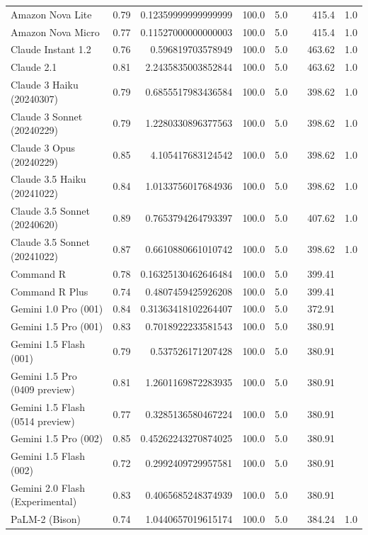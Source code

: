 \begin{table}[htp]
{\begin{tabular}{lrrrrrrr}
Amazon Nova Lite & 0.79 & 0.12359999999999999 & 100.0 & 5.0 &  & 415.4 & 1.0 \\
Amazon Nova Micro & 0.77 & 0.11527000000000003 & 100.0 & 5.0 &  & 415.4 & 1.0 \\
Claude Instant 1.2 & 0.76 & 0.596819703578949 & 100.0 & 5.0 &  & 463.62 & 1.0 \\
Claude 2.1 & 0.81 & 2.2435835003852844 & 100.0 & 5.0 &  & 463.62 & 1.0 \\
Claude 3 Haiku (20240307) & 0.79 & 0.6855517983436584 & 100.0 & 5.0 &  & 398.62 & 1.0 \\
Claude 3 Sonnet (20240229) & 0.79 & 1.2280330896377563 & 100.0 & 5.0 &  & 398.62 & 1.0 \\
Claude 3 Opus (20240229) & 0.85 & 4.105417683124542 & 100.0 & 5.0 &  & 398.62 & 1.0 \\
Claude 3.5 Haiku (20241022) & 0.84 & 1.0133756017684936 & 100.0 & 5.0 &  & 398.62 & 1.0 \\
Claude 3.5 Sonnet (20240620) & 0.89 & 0.7653794264793397 & 100.0 & 5.0 &  & 407.62 & 1.0 \\
Claude 3.5 Sonnet (20241022) & 0.87 & 0.6610880661010742 & 100.0 & 5.0 &  & 398.62 & 1.0 \\
Command R & 0.78 & 0.16325130462646484 & 100.0 & 5.0 &  & 399.41 &  \\
Command R Plus & 0.74 & 0.4807459425926208 & 100.0 & 5.0 &  & 399.41 &  \\
Gemini 1.0 Pro (001) & 0.84 & 0.31363418102264407 & 100.0 & 5.0 &  & 372.91 &  \\
Gemini 1.5 Pro (001) & 0.83 & 0.7018922233581543 & 100.0 & 5.0 &  & 380.91 &  \\
Gemini 1.5 Flash (001) & 0.79 & 0.537526171207428 & 100.0 & 5.0 &  & 380.91 &  \\
Gemini 1.5 Pro (0409 preview) & 0.81 & 1.2601169872283935 & 100.0 & 5.0 &  & 380.91 &  \\
Gemini 1.5 Flash (0514 preview) & 0.77 & 0.3285136580467224 & 100.0 & 5.0 &  & 380.91 &  \\
Gemini 1.5 Pro (002) & 0.85 & 0.45262243270874025 & 100.0 & 5.0 &  & 380.91 &  \\
Gemini 1.5 Flash (002) & 0.72 & 0.2992409729957581 & 100.0 & 5.0 &  & 380.91 &  \\
Gemini 2.0 Flash (Experimental) & 0.83 & 0.4065685248374939 & 100.0 & 5.0 &  & 380.91 &  \\
PaLM-2 (Bison) & 0.74 & 1.0440657019615174 & 100.0 & 5.0 &  & 384.24 & 1.0 \\

\end{tabular}}
\end{table}
